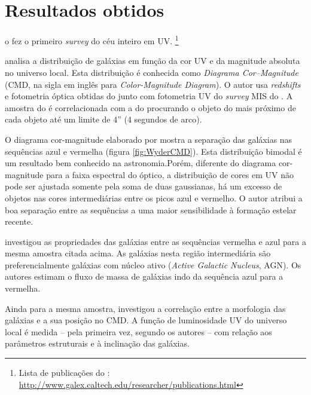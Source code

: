 \section{Resultados obtidos}
\label{sec:Galex:Resultados}

o \galex fez o primeiro {\em survey} do céu inteiro em UV. \footnote{Lista de
publicações do \galex:
\url{http://www.galex.caltech.edu/researcher/publications.html}}

\cite{Wyder2007} analisa a distribuição de galáxias em função da cor UV e da
magnitude absoluta no universo local. Esta distribuição é conhecida como {\em
Diagrama Cor--Magnitude} (CMD, na sigla em inglês para {\em Color-Magnitude
Diagram}). O autor usa {\em redshifts} e fotometria óptica obtidas do \SDSS
junto com fotometria UV do {\em survey} MIS do \galex. A amostra do \SDSS é
correlacionada com a do \galex procurando o objeto do \galex mais próximo de
cada objeto \SDSS até um limite de 4'' (4 segundos de arco).

O diagrama cor-magnitude elaborado por \cite{Wyder2007} mostra a separação das
galáxias nas sequências azul e vermelha (figura \ref{fig:WyderCMD}). Esta
distribuição bimodal é um resultado bem conhecido na astronomia.\citneed Porém,
diferente do diagrama cor-magnitude para a faixa espectral do óptico, a
distribuição de cores em UV não pode ser ajustada somente pela soma de duas
gaussianas, há um excesso de objetos nas cores intermediárias entre os picos
azul e vermelho. O autor atribui a boa separação entre as sequências a uma maior
sensibilidade à formação estelar recente.

\cite{Martin2007} investigou as propriedades das galáxias entre as sequências
vermelha e azul para a mesma amostra citada acima. As galáxias nesta região
intermediária são preferencialmente galáxias com núcleo ativo ({\em Active
Galactic Nucleus}, AGN). Os autores estimam o fluxo de massa de galáxias indo da
sequência azul para a vermelha.

Ainda para a mesma amostra, \cite{Schiminovich2007} investigou a correlação
entre a morfologia das galáxias e a sua posição no CMD. A função de luminosidade
UV do universo local é medida -- pela primeira vez, segundo os autores -- com
relação aos parâmetros estruturais e à inclinação das galáxias.


